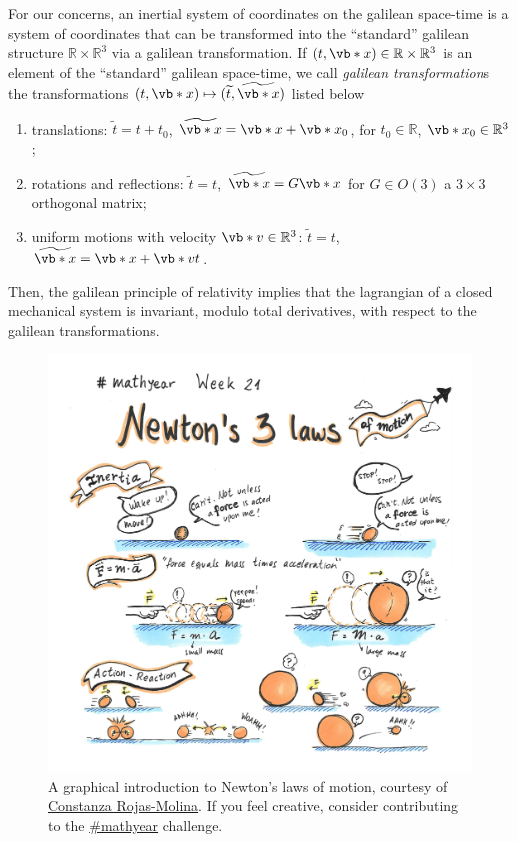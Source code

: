 \documentclass[english,fontsize=11pt,paper=b5]{scrbook}
\theoremstyle{definition}
\newcommand{\emphidx}[1]{\index{#1}\emph{#1}}
\begin{document}
    For our concerns, an inertial system of coordinates on the galilean space-time is a system of coordinates that can be transformed into the ``standard'' galilean structure $\mathbb{R}\times\mathbb{R}^3$ via a galilean transformation.
  If $(t, \vb*{x}) \in \mathbb{R}\times \mathbb{R}^3$ is an element of the ``standard'' galilean space-time, we call \emphidx{galilean transformation}s the transformations $(t,\vb*{x}) \mapsto (\widetilde t, \widetilde{\vb*{x}})$ listed below
    \begin{enumerate}
      \item translations: $\widetilde t = t + t_0$, $\widetilde{\vb*{x}} = \vb*{x} + \vb*{x}_0$, for $t_0\in\mathbb{R}$, $\vb*{x}_0\in\mathbb{R}^3$;
      \item rotations and reflections: $\widetilde t = t$, $\widetilde{\vb*{x}} = G\vb*{x}$ for $G\in O(3)$ a $3\times 3$ orthogonal matrix;
      \item uniform motions with velocity $\vb*{v}\in\mathbb{R}^3$: $\widetilde t = t$, $\widetilde{\vb*{x}} = \vb*{x} + \vb*{v} t$.
    \end{enumerate}
    Then, the galilean principle of relativity implies that the lagrangian of a closed mechanical system is invariant, modulo total derivatives, with respect to the galilean transformations. \medskip

    \begin{figure}[ht]
      \centering
      \includegraphics[width=.85\linewidth]{images/coni-mathyear-21-21.jpg}
      \caption{A graphical introduction to Newton's laws of motion,
        courtesy of \href{https://web.archive.org/web/20210602092955/https://twitter.com/Coni777/status/1399953219997032448}{Constanza Rojas-Molina}.
        If you feel creative, consider contributing to the
      \href{http://crojasmolina.com/illustration/the-mathyear-challenge/list-of-prompts-for-mathyear/}{\#mathyear} challenge.}
    \end{figure}
\end{document}
